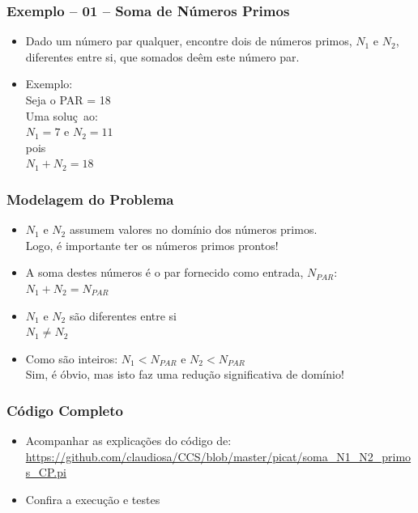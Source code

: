 \begin{frame}[fragile] 

\frametitle{Exemplo -- 01 -- Soma de Números Primos}

\begin{itemize}
  \item Dado um número par qualquer, encontre  dois de números primos, $N_1$ e $N_2$,
diferentes entre si, que somados deêm este número 
par.

\pause
\item Exemplo:\\
Seja o PAR = 18\\
Uma soluç~ao:\\
$N_1 = 7$  e $N_2 = 11$\\
pois\\
$N_1 + N_2 = 18$
\end{itemize}

\end{frame}
\begin{frame}[fragile] 

\frametitle{Modelagem do Problema}

\begin{itemize}
  \item  $N_1$ e $N_2$ assumem valores no domínio dos números primos. \\
  Logo, é importante ter os números primos prontos!

  \pause
   \item A soma destes números é o par fornecido como entrada, $N_{PAR}$:\\
         $N_1 + N_2 = N_{PAR}$

  \pause
  \item  $N_1$ e $N_2$  são diferentes entre si\\
   $N_1 \neq N_2$

  \pause
  \item Como são inteiros: $N_1 < N_{PAR}$ e $N_2 < N_{PAR}$ \\
  Sim, é óbvio, mas isto faz uma redução significativa de domínio!

\end{itemize}

\end{frame}


\begin{frame}[fragile]
 \frametitle{Código Completo}

\begin{itemize}
  \item Acompanhar as explicações do código de:\\
\url{https://github.com/claudiosa/CCS/blob/master/picat/soma_N1_N2_primos_CP.pi}

  \item Confira a execução e testes
\end{itemize}
\end{frame}


